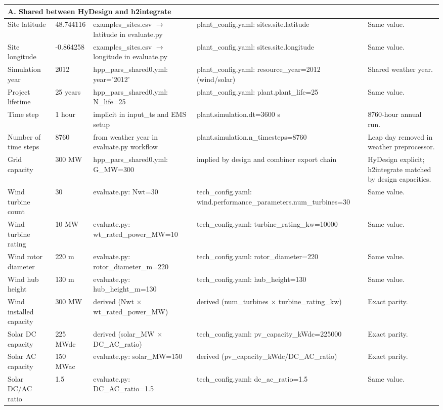 \begin{center}
\begin{longtable}{p{} p{} p{} p{} p{}}
\multicolumn{5}{l}{\textbf{A. Shared between HyDesign and h2integrate}} \\
\midrule
Site latitude & 48.744116 & examples\_sites.csv $\rightarrow$ latitude in evaluate.py & plant\_config.yaml: sites.site.latitude & Same value. \\
Site longitude & -0.864258 & examples\_sites.csv $\rightarrow$ longitude in evaluate.py & plant\_config.yaml: sites.site.longitude & Same value. \\
Simulation year & 2012 & hpp\_pars\_shared0.yml: year='2012' & plant\_config.yaml: resource\_year=2012 (wind/solar) & Shared weather year. \\
Project lifetime & 25 years & hpp\_pars\_shared0.yml: N\_life=25 & plant\_config.yaml: plant.plant\_life=25 & Same value. \\
Time step & 1 hour & implicit in input\_ts and EMS setup & plant.simulation.dt=3600 s & 8760-hour annual run. \\
Number of time steps & 8760 & from weather year in evaluate.py workflow & plant.simulation.n\_timesteps=8760 & Leap day removed in weather preprocessor. \\
Grid capacity & 300 MW & hpp\_pars\_shared0.yml: G\_MW=300 & implied by design and combiner export chain & HyDesign explicit; h2integrate matched by design capacities. \\
Wind turbine count & 30 & evaluate.py: Nwt=30 & tech\_config.yaml: wind.performance\_parameters.num\_turbines=30 & Same value. \\
Wind turbine rating & 10 MW & evaluate.py: wt\_rated\_power\_MW=10 & tech\_config.yaml: turbine\_rating\_kw=10000 & Same value. \\
Wind rotor diameter & 220 m & evaluate.py: rotor\_diameter\_m=220 & tech\_config.yaml: rotor\_diameter=220 & Same value. \\
Wind hub height & 130 m & evaluate.py: hub\_height\_m=130 & tech\_config.yaml: hub\_height=130 & Same value. \\
Wind installed capacity & 300 MW & derived (Nwt $\times$ wt\_rated\_power\_MW) & derived (num\_turbines $\times$ turbine\_rating\_kw) & Exact parity. \\
Solar DC capacity & 225 MWdc & derived (solar\_MW $\times$ DC\_AC\_ratio) & tech\_config.yaml: pv\_capacity\_kWdc=225000 & Exact parity. \\
Solar AC capacity & 150 MWac & evaluate.py: solar\_MW=150 & derived (pv\_capacity\_kWdc/DC\_AC\_ratio) & Exact parity. \\
Solar DC/AC ratio & 1.5 & evaluate.py: DC\_AC\_ratio=1.5 & tech\_config.yaml: dc\_ac\_ratio=1.5 & Same value. \\

\end{longtable}
\end{center}
